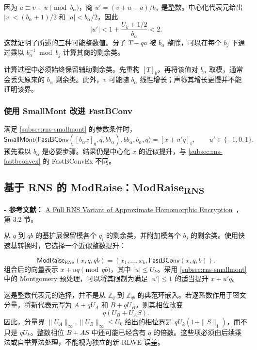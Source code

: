 \begin{myproof}
因为 $a\equiv v+u\pmod{b_\alpha}$，商 $u'=(v+u-a)/b_\alpha$ 是整数。中心化代表元给出 $|v|<(b_\alpha+1)/2$ 和 $|a|<b_\alpha/2$，因此
\[
|u'|<1+\frac{U_k+1/2}{b_\alpha}<2.
\]
这就证明了所述的三种可能整数值。分子 $T-qa$ 被 $b_\alpha$ 整除，可以在每个 $b_j$ 下通过乘以 $b_\alpha^{-1}\bmod b_j$ 计算其商的剩余类。
\end{myproof}

计算过程中必须始终保留辅助剩余类。先重构 $[T]_b$，再将该值对 $b_\alpha$ 取模，通常会丢失原来的 $b_\alpha$ 剩余类。此外，$v$ 可能随 $b_\alpha$ 线性增长；声称其增长更慢并不能证明该界。

\subsubsection{使用 \textsf{SmallMont} 改进 \textsf{FastBConv}}
\label{subsubsec:rns-smallmont-fastbconv}

满足 \autoref{subsec:rns-smallmont} 的参数条件时，
\[
\textsf{SmallMont}\bigl(\textsf{FastBConv}([b_\alpha x]_q,q,bb_\alpha),bb_\alpha,b_\alpha,q\bigr)
=[x+u'q]_b,\qquad u'\in\{-1,0,1\}.
\]
预先乘以 $b_\alpha$ 是必要步骤。结果仍是中心化 $x$ 的近似提升，与 \autoref{subsec:rns-fastbconvex} 的 \textsf{FastBConvEx} 不同。


\subsection{基于 RNS 的 ModRaise：\textsf{ModRaise\textsubscript{RNS}}}
\label{subsec:rns-modraise}

\noindent \textbf{- 参考文献：} \href{https://eprint.iacr.org/2018/931}{A Full RNS Variant of Approximate Homomorphic Encryption}~\cite{rns-ckks}，第 3.2 节。

从 $q$ 到 $qb$ 的基扩展保留模各个 $q_i$ 的剩余类，并附加模各个 $b_j$ 的剩余类。使用快速基转换时，它选择一个近似整数提升：
\begin{tcolorbox}[title={\textbf{\tboxlabel{\ref*{subsec:rns-modraise}} \textsf{ModRaise\textsubscript{RNS}}}}]
\[
\textsf{ModRaise}_{\mathrm{RNS}}(x,q,qb)
=(x_1,\ldots,x_k,\textsf{FastBConv}(x,q,b)).
\]
组合后的向量表示 $x+uq\pmod{qb}$，其中 $|u|\leq U_k$。采用 \autoref{subsec:rns-smallmont} 中的 Montgomery 预处理，可以将其限制为满足 $|u'|\leq1$ 的适当提升 $x+u'q$。
\end{tcolorbox}

这是整数代表元的选择，并不是从 $\mathbb Z_q$ 到 $\mathbb Z_{qb}$ 的典范环嵌入。若逐系数作用于密文分量，将新代表元写为 $A+qU_A$ 和 $B+qU_B$，则其相位改变
\[
q(U_B+U_AS).
\]
因此，分量界 $\|U_A\|_\infty,\|U_B\|_\infty\leq U_k$ 给出的相位界是 $qU_k(1+\|S\|_1)$，而不只是 $qU_k$。整数相位 $B+AS$ 中还可能已经含有 $q$ 的倍数。这些项必须由后续乘法或自举算法处理，不能视为独立的新 RLWE 误差。

